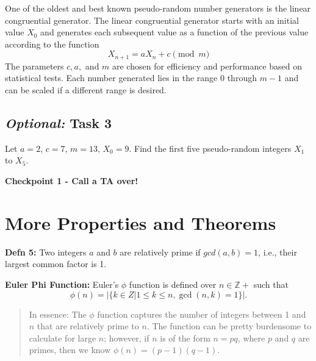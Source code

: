 \documentclass[12pt,letterpaper]{article}
\newcommand\Z{\mathbb Z}
\newif\ifsol
\newcommand{\solu}[2]{ \begin{mdframed} \ifsol #2 \else \vspace{#1} \fi \end{mdframed} }
\begin{document}
One of the oldest and best known pseudo-random number generators is the linear congruential generator. The linear congruential generator starts with an initial value $X_0$ and generates each subsequent value as a function of the previous value according to the function
\begin{equation*}
    X_{n+1}=aX_n+c \pmod m
\end{equation*}
The parameters $c, a,$ and $m$ are chosen for efficiency and performance based on statistical tests. Each number generated lies in the range $0$ through $m - 1$ and can be scaled if a different range is desired.

\subsection*{\textit{Optional:} Task 3}

\item Let $a=2$, $c=7$, $m=13$, $X_0 = 9$. Find the first five pseudo-random integers $X_1$ to $X_5$.

\solu{4cm}{
We will use $X_{n+1}=2X_n+7 \pmod{13}$ to find $X_1...X_5$, where $X_0=9$.

$X_1 = 2\cdot 9+7 \pmod{13} = 12$

$X_2 = 2\cdot 12+7 \pmod{13} = 5$

$X_3 = 2\cdot 5+7 \pmod{13} = 4$

$X_4 = 2\cdot 4+7 \pmod{13} = 2$

$X_5 = 2\cdot 2+7 \pmod{13} = 11$
}

\textbf{Checkpoint 1 - Call a TA over!}

\newpage
   \section*{More Properties and Theorems}
	
	\textbf{Defn 5:} Two integers $a$ and $b$ are relatively prime if $gcd(a, b) = 1$, i.e., their largest common factor is 1.
	
	\textbf{Euler Phi Function:} Euler’s $\phi$ function is defined over $n \in \Z+$ such that 
	\[ \phi(n) = |\{k \in Z|  1 \leq k \leq n, \gcd(n, k) = 1\}|. \]
    
    \begin{quote}
    In essence: The $\phi$ function captures the number of integers between 1 and $n$ that are relatively prime to
    $n$. The function can be pretty burdensome to calculate for large $n$; however, if $n$ is of
    the form $n = pq$, where $p$ and $q$ are primes, then we know $\phi(n) = (p-1)(q-1)$.
    \end{quote}
\end{document}
